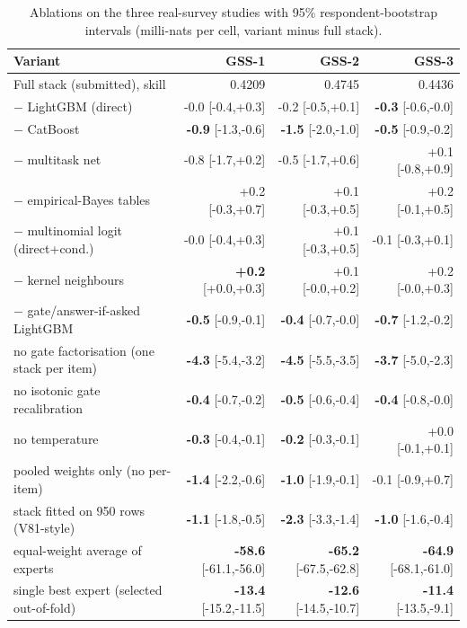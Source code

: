 \begin{table}[t]
\centering
\scriptsize
\setlength{\tabcolsep}{3pt}
\caption{Ablations on the three real-survey studies with 95\% respondent-bootstrap intervals (milli-nats per cell, variant minus full stack).}
\label{tab:ablation-ci}
\begin{tabular}{lrrr}
\toprule
Variant & GSS-1 & GSS-2 & GSS-3 \\
\midrule
Full stack (submitted), skill & 0.4209 & 0.4745 & 0.4436 \\
\midrule
$-$ LightGBM (direct) & -0.0 {\scriptsize[-0.4,+0.3]} & -0.2 {\scriptsize[-0.5,+0.1]} & \textbf{-0.3} {\scriptsize[-0.6,-0.0]} \\
$-$ CatBoost & \textbf{-0.9} {\scriptsize[-1.3,-0.6]} & \textbf{-1.5} {\scriptsize[-2.0,-1.0]} & \textbf{-0.5} {\scriptsize[-0.9,-0.2]} \\
$-$ multitask net & -0.8 {\scriptsize[-1.7,+0.2]} & -0.5 {\scriptsize[-1.7,+0.6]} & +0.1 {\scriptsize[-0.8,+0.9]} \\
$-$ empirical-Bayes tables & +0.2 {\scriptsize[-0.3,+0.7]} & +0.1 {\scriptsize[-0.3,+0.5]} & +0.2 {\scriptsize[-0.1,+0.5]} \\
$-$ multinomial logit (direct+cond.) & -0.0 {\scriptsize[-0.4,+0.3]} & +0.1 {\scriptsize[-0.3,+0.5]} & -0.1 {\scriptsize[-0.3,+0.1]} \\
$-$ kernel neighbours & \textbf{+0.2} {\scriptsize[+0.0,+0.3]} & +0.1 {\scriptsize[-0.0,+0.2]} & +0.2 {\scriptsize[-0.0,+0.3]} \\
$-$ gate/answer-if-asked LightGBM & \textbf{-0.5} {\scriptsize[-0.9,-0.1]} & \textbf{-0.4} {\scriptsize[-0.7,-0.0]} & \textbf{-0.7} {\scriptsize[-1.2,-0.2]} \\
no gate factorisation (one stack per item) & \textbf{-4.3} {\scriptsize[-5.4,-3.2]} & \textbf{-4.5} {\scriptsize[-5.5,-3.5]} & \textbf{-3.7} {\scriptsize[-5.0,-2.3]} \\
no isotonic gate recalibration & \textbf{-0.4} {\scriptsize[-0.7,-0.2]} & \textbf{-0.5} {\scriptsize[-0.6,-0.4]} & \textbf{-0.4} {\scriptsize[-0.8,-0.0]} \\
no temperature & \textbf{-0.3} {\scriptsize[-0.4,-0.1]} & \textbf{-0.2} {\scriptsize[-0.3,-0.1]} & +0.0 {\scriptsize[-0.1,+0.1]} \\
pooled weights only (no per-item) & \textbf{-1.4} {\scriptsize[-2.2,-0.6]} & \textbf{-1.0} {\scriptsize[-1.9,-0.1]} & -0.1 {\scriptsize[-0.9,+0.7]} \\
stack fitted on 950 rows (V81-style) & \textbf{-1.1} {\scriptsize[-1.8,-0.5]} & \textbf{-2.3} {\scriptsize[-3.3,-1.4]} & \textbf{-1.0} {\scriptsize[-1.6,-0.4]} \\
equal-weight average of experts & \textbf{-58.6} {\scriptsize[-61.1,-56.0]} & \textbf{-65.2} {\scriptsize[-67.5,-62.8]} & \textbf{-64.9} {\scriptsize[-68.1,-61.0]} \\
single best expert (selected out-of-fold) & \textbf{-13.4} {\scriptsize[-15.2,-11.5]} & \textbf{-12.6} {\scriptsize[-14.5,-10.7]} & \textbf{-11.4} {\scriptsize[-13.5,-9.1]} \\
\bottomrule
\end{tabular}
\end{table}
